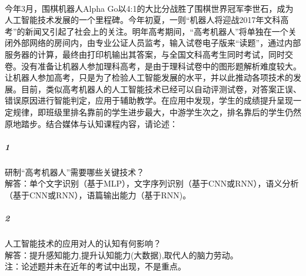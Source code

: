 \documentclass[UTF8]{ctexart}
\begin{document}
\paragraph{}
今年3月，围棋机器人Alpha Go以4:1的大比分战胜了围棋世界冠军李世石，成为人工智能技术发展的一个里程碑。今年初夏，一则“机器人将迎战2017年文科高考”的新闻又引起了社会上的关注。明年高考期间，“高考机器人”将单独在一个关闭外部网络的房间内，由专业公证人员监考，输入试卷电子版来“读题”，通过内部服务器的计算，最终由打印机输出其答案，与全国文科高考生同时考试，同时交卷。没有准备让机器人参加理科高考，是由于理科试卷中的图形题解析难度较大。让机器人参加高考，只是为了检验人工智能发展的水平，并以此推动各项技术的发展。目前，类似高考机器人的人工智能技术已经可以自动评测试卷，对答案正误、错误原因进行智能判定，应用于辅助教学。在应用中发现，学生的成绩提升呈现一定规律，即班级里排名靠前的学生进步最大，中游学生次之，排名靠后的学生仍然原地踏步。结合媒体与认知课程内容，请论述：
\subparagraph{1}
研制“高考机器人”需要哪些关键技术？\\
解答：单个文字识别（基于MLP），文字序列识别（基于CNN或RNN），语义分析（基于CNN或RNN），语篇输出能力（基于RNN)。
\subparagraph{2}
人工智能技术的应用对人的认知有何影响？\\
解答：提升感知能力,提升认知能力(大数据),取代人的脑力劳动。\\
注：论述题并未在近年的考试中出现，不是重点。
\end{document}
